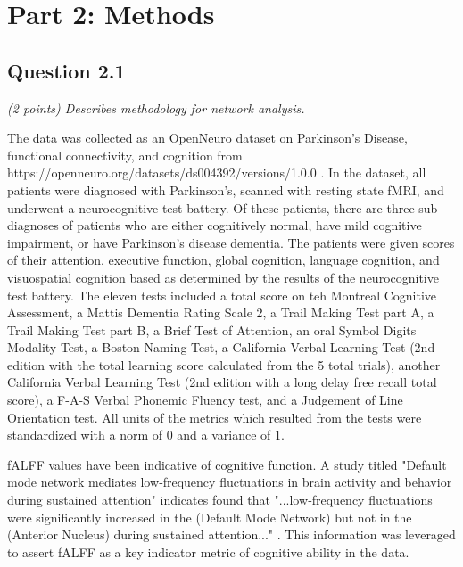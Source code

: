 \documentclass[12pt]{article}
\begin{document}
\section{Part 2: Methods}

\subsection{Question 2.1}
\textit{ (2 points) Describes methodology for network analysis.}

The data was collected as an OpenNeuro dataset on Parkinson's Disease, functional connectivity, and cognition from https://openneuro.org/datasets/ds004392/versions/1.0.0 \cite{ds004392:1.0.0}. In the dataset, all patients were diagnosed with Parkinson's, scanned with resting state fMRI, and underwent a neurocognitive test battery. Of these patients, there are three sub-diagnoses of patients who are either cognitively normal, have mild cognitive impairment, or have Parkinson's disease dementia. The patients were given scores of their attention, executive function, global cognition, language cognition, and visuospatial cognition based as determined by the results of the neurocognitive test battery. The eleven tests included a total score on teh Montreal Cognitive Assessment, a Mattis Dementia Rating Scale 2, a Trail Making Test part A, a Trail Making Test part B, a Brief Test of Attention, an oral Symbol Digits Modality Test, a Boston Naming Test, a California Verbal Learning Test (2nd edition with the total learning score calculated from the 5 total trials), another California Verbal Learning Test (2nd edition with a long delay free recall total score), a F-A-S Verbal Phonemic Fluency test, and a Judgement of Line Orientation test. All units of the metrics which resulted from the tests were standardized with a norm of 0 and a variance of 1.

fALFF values have been indicative of cognitive function. A study titled "Default mode network mediates low‐frequency fluctuations in brain activity and behavior during sustained attention" indicates found that "...low‐frequency fluctuations were significantly increased in the (Default Mode Network) but not in the (Anterior Nucleus) during sustained attention..." \cite{35903957}. This information was leveraged to assert fALFF as a key indicator metric of cognitive ability in the data.
\end{document}
